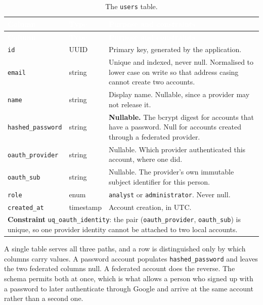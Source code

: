 \begin{longtable}{|p{}|p{}|p{}|}
\caption{The \texttt{users} table.}\label{tab:usersschema}\\
\hline
\rowcolor{myblue}\textcolor{white}{\textbf{Column}} & \textcolor{white}{\textbf{Type}} & \textcolor{white}{\textbf{Purpose and constraints}} \\
\hline
\endfirsthead
\hline
\rowcolor{myblue}\textcolor{white}{\textbf{Column}} & \textcolor{white}{\textbf{Type}} & \textcolor{white}{\textbf{Purpose and constraints}} \\
\hline
\endhead
\texttt{id} & UUID & Primary key, generated by the application. \\ \hline
\texttt{email} & string & Unique and indexed, never null. Normalised to lower case on write so that address casing cannot create two accounts. \\ \hline
\texttt{name} & string & Display name. Nullable, since a provider may not release it. \\ \hline
\texttt{hashed\_password} & string & \textbf{Nullable.} The bcrypt digest for accounts that have a password. Null for accounts created through a federated provider. \\ \hline
\texttt{oauth\_provider} & string & Nullable. Which provider authenticated this account, where one did. \\ \hline
\texttt{oauth\_sub} & string & Nullable. The provider's own immutable subject identifier for this person. \\ \hline
\texttt{role} & enum & \texttt{analyst} or \texttt{administrator}. Never null. \\ \hline
\texttt{created\_at} & timestamp & Account creation, in UTC. \\ \hline
\multicolumn{3}{|p{0.92\textwidth}|}{\textbf{Constraint} \texttt{uq\_oauth\_identity}: the pair (\texttt{oauth\_provider}, \texttt{oauth\_sub}) is unique, so one provider identity cannot be attached to two local accounts.} \\ \hline
\end{longtable}

A single table serves all three paths, and a row is distinguished only by which columns carry
values. A password account populates \texttt{hashed\_password} and leaves the two federated
columns null. A federated account does the reverse. The schema permits both at once, which is
what allows a person who signed up with a password to later authenticate through Google and
arrive at the same account rather than a second one.

